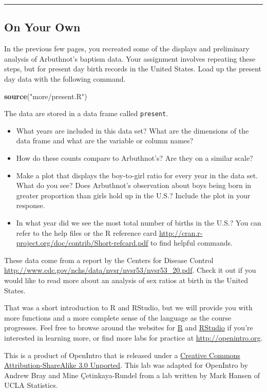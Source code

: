 \documentclass[]{article}
\newenvironment{Shaded}{\begin{snugshade}}{\end{snugshade}}
\newcommand{\KeywordTok}[1]{\textcolor[rgb]{0.13,0.29,0.53}{\textbf{#1}}}
\newcommand{\StringTok}[1]{\textcolor[rgb]{0.31,0.60,0.02}{#1}}
\newcommand{\NormalTok}[1]{#1}
\begin{document}
\begin{center}\rule{0.5\linewidth}{\linethickness}\end{center}

\subsection{On Your Own}\label{on-your-own}

In the previous few pages, you recreated some of the displays and
preliminary analysis of Arbuthnot's baptism data. Your assignment
involves repeating these steps, but for present day birth records in the
United States. Load up the present day data with the following command.

\begin{Shaded}
\begin{Highlighting}[]
\KeywordTok{source}\NormalTok{(}\StringTok{"more/present.R"}\NormalTok{)}
\end{Highlighting}
\end{Shaded}

The data are stored in a data frame called \texttt{present}.

\begin{itemize}
\item
  What years are included in this data set? What are the dimensions of
  the data frame and what are the variable or column names?
\item
  How do these counts compare to Arbuthnot's? Are they on a similar
  scale?
\item
  Make a plot that displays the boy-to-girl ratio for every year in the
  data set. What do you see? Does Arbuthnot's observation about boys
  being born in greater proportion than girls hold up in the U.S.?
  Include the plot in your response.
\item
  In what year did we see the most total number of births in the U.S.?
  You can refer to the help files or the R reference card
  \url{http://cran.r-project.org/doc/contrib/Short-refcard.pdf} to find
  helpful commands.
\end{itemize}

These data come from a report by the Centers for Disease Control
\url{http://www.cdc.gov/nchs/data/nvsr/nvsr53/nvsr53_20.pdf}. Check it
out if you would like to read more about an analysis of sex ratios at
birth in the United States.

That was a short introduction to R and RStudio, but we will provide you
with more functions and a more complete sense of the language as the
course progresses. Feel free to browse around the websites for
\href{http://www.r-project.org}{R} and
\href{http://rstudio.org}{RStudio} if you're interested in learning
more, or find more labs for practice at \url{http://openintro.org}.

\hypertarget{license}{}
This is a product of OpenIntro that is released under a
\href{http://creativecommons.org/licenses/by-sa/3.0}{Creative Commons
Attribution-ShareAlike 3.0 Unported}. This lab was adapted for OpenIntro
by Andrew Bray and Mine Çetinkaya-Rundel from a lab written by Mark
Hansen of UCLA Statistics.
\end{document}
